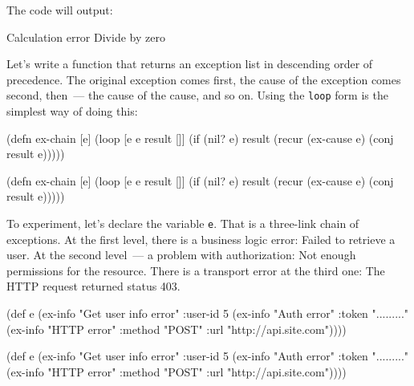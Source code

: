 \fi

\noindent
The code will output:

\begin{text}
Calculation error
Divide by zero
\end{text}

Let's write a function that returns an exception list in descending order of precedence. The original exception comes first, the cause of the exception comes second, then~--- the cause of the cause, and so on. Using the \verb|loop| form is the simplest way of doing this:


\ifnarrow

\begin{clojure}
(defn ex-chain [e]
  (loop [e e
         result []]
    (if (nil? e)
      result
      (recur (ex-cause e)
        (conj result e)))))
\end{clojure}

\else

\begin{clojure}
(defn ex-chain [e]
  (loop [e e
         result []]
    (if (nil? e)
      result
      (recur (ex-cause e) (conj result e)))))
\end{clojure}

\fi

To experiment, let's declare the variable \verb|e|. That is a three-link chain of exceptions. At the first level, there is a business logic error: Failed to retrieve a user. At the second level~--- a problem with authorization: Not enough permissions for the resource. There is a transport error at the third one: The HTTP request returned status 403.

\label{e-sample}

\ifnarrow

\begin{clojure}
(def e
  (ex-info
   "Get user info error"
   {:user-id 5}
   (ex-info
     "Auth error"
     {:token "........."}
     (ex-info
       "HTTP error"
       {:method "POST"
        :url "http://api.site.com"}))))
\end{clojure}

\else

\begin{clojure}
(def e
  (ex-info
   "Get user info error"
   {:user-id 5}
   (ex-info "Auth error"
            {:token "........."}
            (ex-info "HTTP error"
                     {:method "POST"
                      :url "http://api.site.com"}))))
\end{clojure}

